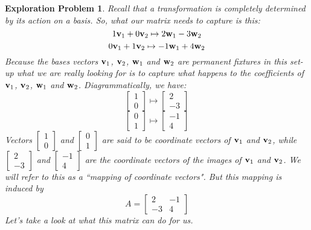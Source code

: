 \documentclass{ximera}
\renewcommand{\vec}[1]{{\bf #1}}
\newcommand{\dfn}{\textit}
\newtheorem{initprob}{Exploration Problem}
\begin{document}
\begin{initprob}
Recall that a transformation is completely determined by its action on a basis.  So, what our matrix needs to capture is this:
$$1\vec{v}_1+0\vec{v}_2\mapsto 2\vec{w}_1-3\vec{w}_2$$
$$0\vec{v}_1+1\vec{v}_2\mapsto -1\vec{w}_1+4\vec{w}_2$$
Because the bases vectors $\vec{v}_1$, $\vec{v}_2$, $\vec{w}_1$ and $\vec{w}_2$ are permanent fixtures in this set-up what we are really looking for is to capture what happens to the coefficients of $\vec{v}_1$, $\vec{v}_2$, $\vec{w}_1$ and $\vec{w}_2$.   Diagrammatically, we have:
$$\begin{bmatrix}1\\0\end{bmatrix}\mapsto\begin{bmatrix}2\\-3\end{bmatrix}$$
$$\begin{bmatrix}0\\1\end{bmatrix}\mapsto\begin{bmatrix}-1\\4\end{bmatrix}$$
Vectors $\begin{bmatrix}1\\0\end{bmatrix}$ and $\begin{bmatrix}0\\1\end{bmatrix}$ are said to be \dfn{coordinate vectors} of $\vec{v}_1$ and $\vec{v}_2$, while $\begin{bmatrix}2\\-3\end{bmatrix}$ and $\begin{bmatrix}-1\\4\end{bmatrix}$ are the \dfn{coordinate vectors} of the images of $\vec{v}_1$ and $\vec{v}_2$. We will refer to this as a ``mapping of coordinate vectors".  But this mapping is induced by 
$$A=\begin{bmatrix}2&-1\\-3&4\end{bmatrix}$$
Let's take a look at what this matrix can do for us.


\end{initprob}
\end{document}
